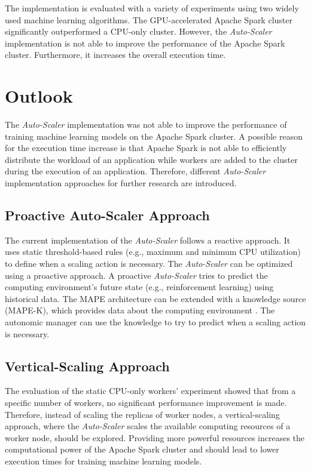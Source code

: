 The implementation is evaluated with a variety of experiments using two widely used machine learning algorithms.
The GPU-accelerated Apache Spark cluster significantly outperformed a CPU-only cluster.
However, the \textit{Auto-Scaler} implementation is not able to improve the performance of the Apache Spark cluster. Furthermore, it increases the overall execution time.


\section{Outlook}
The \textit{Auto-Scaler} implementation was not able to improve the performance of training machine learning models on the Apache Spark cluster.
A possible reason for the execution time increase is that Apache Spark is not able to efficiently distribute the workload of an application while workers are added to the cluster during the execution of an application.
Therefore, different \textit{Auto-Scaler} implementation approaches for further research are introduced.


\subsection{Proactive Auto-Scaler Approach}
The current implementation of the \textit{Auto-Scaler} follows a reactive approach. It uses static threshold-based rules (e.g., maximum and minimum CPU utilization) to define when a scaling action is necessary.
The \textit{Auto-Scaler} can be optimized using a proactive approach. A proactive \textit{Auto-Scaler} tries to predict the computing environment's future state (e.g., reinforcement learning) using historical data.
The MAPE architecture can be extended with a knowledge source (MAPE-K), which provides data about the computing environment \cite{Sinreich2006AnAB}. The autonomic manager can use the knowledge to try to predict when a scaling action is necessary.


\subsection{Vertical-Scaling Approach}
The evaluation of the static CPU-only workers' experiment showed that from a specific number of workers, no significant performance improvement is made.
Therefore, instead of scaling the replicas of worker nodes, a vertical-scaling approach, where the \textit{Auto-Scaler} scales the available computing resources of a worker node, should be explored.
Providing more powerful resources increases the computational power of the Apache Spark cluster and should lead to lower execution times for training machine learning models.


